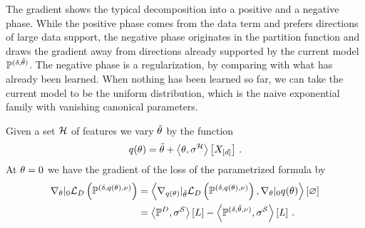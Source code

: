

The gradient shows the typical decomposition into a positive and a negative phase.
While the positive phase comes from the data term and prefers directions of large data support, the negative phase originates in the partition function and draws the gradient away from directions already supported by the current model $\mathbb{P}^{(\delta, \tilde{\theta})}$.
The negative phase is a regularization, by comparing with what has already been learned.
When nothing has been learned so far, we can take the current model to be the uniform distribution, which is the naive exponential family with vanishing canonical parameters.


Given a set $\mathcal{H}$ of features we vary $\tilde{\theta}$ by the function
\begin{align*}
    q(\theta) = \tilde{\theta} + \left\langle \theta,\sigma^{\mathcal{H}}\right\rangle \left[ X_{[d]} \right] \, .
\end{align*}
At $\theta=0$ we have the gradient of the loss of the parametrized formula by
\begin{align*}
    \nabla_{\theta}|_{0}
    \mathcal{L}_{D}\left(\mathbb{P}^{(\delta,q(\theta),\nu)}\right)
    &= \left\langle 
        \nabla_{q(\theta)}|_{\tilde{\theta}}  \mathcal{L}_{D}\left(\mathbb{P}^{(\delta,q(\theta),\nu)}\right),
        \nabla_{\theta}|_{0}  q(\theta)
    \right\rangle \left[ \varnothing \right]  \\
    &= \left\langle \mathbb{P}^{D},\sigma^{\mathcal{S}}\right\rangle \left[ L \right] -   \left\langle \mathbb{P}^{(\delta, \tilde{\theta}, \nu)},\sigma^{\mathcal{S}}\right\rangle \left[ L \right] \, .
\end{align*}


